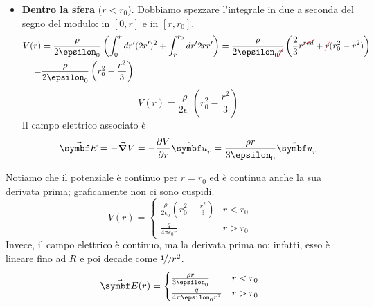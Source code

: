 \begin{examplewt}
\begin{itemize}
		\item \textbf{Dentro la sfera} ($r<r_0$). Dobbiamo spezzare l'integrale in due a seconda del segno del modulo: in $\left[0,r\right]$ e in $\left[r, r_0\right]$.
		\begin{align*}
			V(r)&=\frac{\rho}{2\epsilon_0}\left( \int^r_0 dr'(2r')^2 + \int^{r_0}_r dr' 2rr' \right)= \frac{\rho}{2\epsilon_0 \Ccancel[red]{r}} \left( \frac{2}{3} r^{\Ccancel[red]{red}} + \Ccancel[red]{r} (r_0^2 -r^2) \right)\\
			=&\frac{\rho}{2\epsilon_0}\left( r_0^2 -\frac{r^2}{3} \right)
		\end{align*}
		\begin{equation*}
			V(r)=\frac{\rho}{2\epsilon_0}\left( r_0^2 -\frac{r^2}{3} \right)
		\end{equation*}
		Il campo elettrico associato è
		\begin{equation*}
			\vba{E}=-\grad V= -\pdv{V}{r}\vbh{u}_r =\frac{\rho r}{3\epsilon_0}\vbh{u}_r
		\end{equation*}
	\end{itemize}
	Notiamo che il potenziale è continuo per $r=r_0$ ed è continua anche la sua derivata prima; graficamente non ci sono cuspidi.
	\begin{equation*}
		V(r)=\begin{cases}
			\frac{\rho}{2\epsilon_0}(r_0^2 -\frac{r^2}{3}) & r<r_0\\
			\frac{q}{4\pi\epsilon_0 r} &r>r_0
		\end{cases}
	\end{equation*}
	Invece, il campo elettrico è continuo, ma la derivata prima no: infatti, esso è lineare fino ad $R$ e poi decade come $\nicefrac{1}/{r}^2$.
	\begin{equation*}
		\vba{E}(r)=\begin{cases}
			\frac{\rho r}{3\epsilon_0} & r<r_0\\
			\frac{q}{4\pi\epsilon_0 r^2} & r>r_0
		\end{cases}
	\end{equation*}
\end{examplewt}